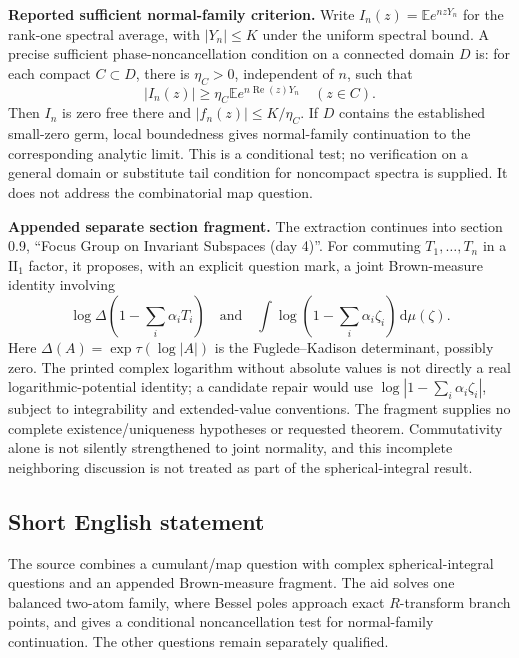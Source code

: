 \documentclass[11pt]{article}
\begin{document}
\textbf{Reported sufficient normal-family criterion.} Write \(I_n(z)=\mathbb E e^{nzY_n}\) for the rank-one spectral average, with \(|Y_n|\leq K\) under the uniform spectral bound. A precise sufficient phase-noncancellation condition on a connected domain \(D\) is: for each compact \(C\subset D\), there is \(\eta_C>0\), independent of \(n\), such that
\[
 |I_n(z)|\geq\eta_C\mathbb E e^{n\operatorname{Re}(z)Y_n}
 \quad(z\in C).
\]
Then \(I_n\) is zero free there and \(|f_n(z)|\leq K/\eta_C\). If \(D\) contains the established small-zero germ, local boundedness gives normal-family continuation to the corresponding analytic limit. This is a conditional test; no verification on a general domain or substitute tail condition for noncompact spectra is supplied. It does not address the combinatorial map question.

\textbf{Appended separate section fragment.} The extraction continues into section 0.9, ``Focus Group on Invariant Subspaces (day 4)''. For commuting \(T_1,\ldots,T_n\) in a \(\mathrm{II}_1\) factor, it proposes, with an explicit question mark, a joint Brown-measure identity involving
\[
 \log\Delta\left(1-\sum_i\alpha_iT_i\right)
 \quad\text{and}\quad
 \int\log\left(1-\sum_i\alpha_i\zeta_i\right)\,\mathrm d\mu(\zeta).
\]
Here \(\Delta(A)=\exp\tau(\log|A|)\) is the Fuglede--Kadison determinant, possibly zero. The printed complex logarithm without absolute values is not directly a real logarithmic-potential identity; a candidate repair would use \(\log|1-\sum_i\alpha_i\zeta_i|\), subject to integrability and extended-value conventions. The fragment supplies no complete existence/uniqueness hypotheses or requested theorem. Commutativity alone is not silently strengthened to joint normality, and this incomplete neighboring discussion is not treated as part of the spherical-integral result.
\subsection{Short English statement}
The source combines a cumulant/map question with complex spherical-integral questions and an appended Brown-measure fragment. The aid solves one balanced two-atom family, where Bessel poles approach exact \(R\)-transform branch points, and gives a conditional noncancellation test for normal-family continuation. The other questions remain separately qualified.
\end{document}
